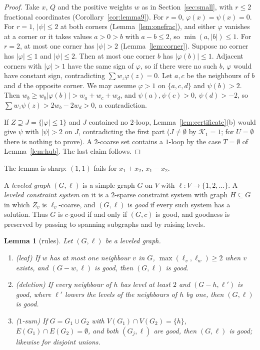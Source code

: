 \documentclass[11pt,letterpaper]{article}
\newtheorem{lemma}[theorem]{Lemma}
\theoremstyle{definition}
\begin{document}
\begin{proof}
Take $x$, $Q$ and the positive weights $w$ as in Section~\ref{sec:small}, with $r\le2$ fractional
coordinates (Corollary~\ref{cor:lemma9}). For $r=0$, $\varphi(x)=\psi(x)=0$. For $r=1$, $|\psi|\le2$
at both corners (Lemma~\ref{lem:onefrac}), and either $\varphi$ vanishes at a corner or it takes
values $a>0>b$ with $a-b\le2$, so $\min(a,|b|)\le1$. For $r=2$, at most one corner has $|\psi|>2$
(Lemma~\ref{lem:corner}). Suppose no corner has $|\varphi|\le1$ and $|\psi|\le2$. Then at most one
corner $b$ has $|\varphi(b)|\le1$. Adjacent corners with $|\varphi|>1$ have the same sign of $\varphi$,
so if there were no such $b$, $\varphi$ would have constant sign, contradicting $\sum w_z\varphi(z)=0$.
Let $a,c$ be the neighbours of $b$ and $d$ the opposite corner. We may assume $\varphi>1$ on
$\{a,c,d\}$ and $\psi(b)>2$. Then $w_b\ge w_b|\varphi(b)|>w_a+w_c+w_d$, and
$\psi(a),\psi(c)>0$, $\psi(d)>-2$, so $\sum w_z\psi(z)>2w_b-2w_d>0$, a contradiction.

If $Z\supseteq J=\{|\varphi|\le1\}$ and $J$ contained no $2$-loop, Lemma~\ref{lem:certificate}(b)
would give $\psi$ with $|\psi|>2$ on $J$, contradicting the first part ($J\ne\emptyset$ by $\mathcal{K}_1=1$;
for $U=\emptyset$ there is nothing to prove). A $2$-coarse set contains a $1$-loop by the case
$T=\emptyset$ of Lemma~\ref{lem:hub}. The last claim follows.
\end{proof}

The lemma is sharp: $(1,1)$ fails for $x_1+x_2$, $x_1-x_2$.

A \emph{leveled graph} $(G,\ell)$ is a simple graph $G$ on $V$ with $\ell\colon V\to\{1,2,\dots\}$. A
\emph{leveled constraint system} on it is a $2$-sparse constraint system with graph $H\subseteq G$ in
which $Z_v$ is $\ell_v$-coarse, and $(G,\ell)$ is \emph{good} if every such system has a solution.
Thus $G$ is $c$-good if and only if $(G,c)$ is good, and goodness is preserved by passing to spanning
subgraphs and by raising levels.

\begin{lemma}[rules]\label{lem:ruleslv}
Let $(G,\ell)$ be a leveled graph.
\begin{enumerate}[label=(\alph*),itemsep=0pt]
\item \emph{(leaf)} If $w$ has at most one neighbour $v$ in $G$, $\max(\ell_v,\ell_w)\ge2$ when $v$
exists, and $(G-w,\ell)$ is good, then $(G,\ell)$ is good.
\item \emph{(deletion)} If every neighbour of $h$ has level at least $2$ and $(G-h,\ell')$ is good,
where $\ell'$ lowers the levels of the neighbours of $h$ by one, then $(G,\ell)$ is good.
\item \emph{($1$-sum)} If $G=G_1\cup G_2$ with $V(G_1)\cap V(G_2)=\{h\}$, $E(G_1)\cap
E(G_2)=\emptyset$, and both $(G_j,\ell)$ are good, then $(G,\ell)$ is good; likewise for disjoint
unions.
\end{enumerate}
\end{lemma}
\end{document}
